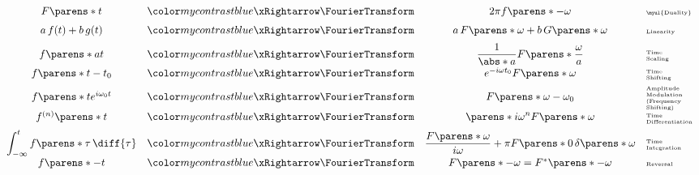 \begin{multicols}{2}
\begin{CheatsheetEntryFrame}
        \begin{equation*}
            \begin{array}{cccl}
                F\parens*{t}
                &\TmpFTArrow&
                2 \pi f \parens*{-\omega}
                & \text{\tiny\myul{Duality}}
                \\[0.6em]
                a \, f(t) + b \, g(t)
                &\TmpFTArrow&
                a \, F\parens*{\omega} + b \, G\parens*{\omega}
                & \text{\tiny Linearity}
                \\[0.6em]
                {\displaystyle f\parens*{a t}}
                &\TmpFTArrow&
                {\displaystyle \frac{1}{\abs*{a}} F\parens*{\frac{\omega}{a}}}
                & \text{\tiny\parbox{6em}{Time\\Scaling}}
                \\[0.6em]
                f\parens*{t - t_0}
                &\TmpFTArrow&
                e^{-i \omega t_0} F\parens*{\omega}
                & \text{\tiny\parbox{6em}{Time\\Shifting}}
                \\[0.6em]
                f\parens*{t} e^{i \omega_0 t}
                &\TmpFTArrow&
                F\parens*{\omega - \omega_0}
                & \text{\tiny\parbox{6em}{Amplitude\\Modulation\\(Frequency\\Shifting)}}
                \\[0.6em]
                f^{(n)}\parens*{t}
                &\TmpFTArrow&
                \parens*{i \omega}^n F\parens*{\omega}
                & \text{\tiny\parbox{6em}{Time\\Differentiation}}
                \\[0.6em]
                {\displaystyle \int_{-\infty}^t f\parens*{\tau} \,\diff{\tau}}
                &\TmpFTArrow&
                {\displaystyle
                    \frac{F\parens*{\omega}}{i \omega}
                    + \pi F\parens*{0} \, \delta\parens*{\omega}
                }
                & \text{\tiny\parbox{6em}{Time\\Integration}}
                \\[0.6em]
                f\parens*{-t}
                &\TmpFTArrow&
                F\parens*{-\omega}
                = F^*\parens*{-\omega}
                & \text{\tiny Reversal}
                \\[0.6em]

\end{array}
\end{equation*}
\end{CheatsheetEntryFrame}
\end{multicols}
